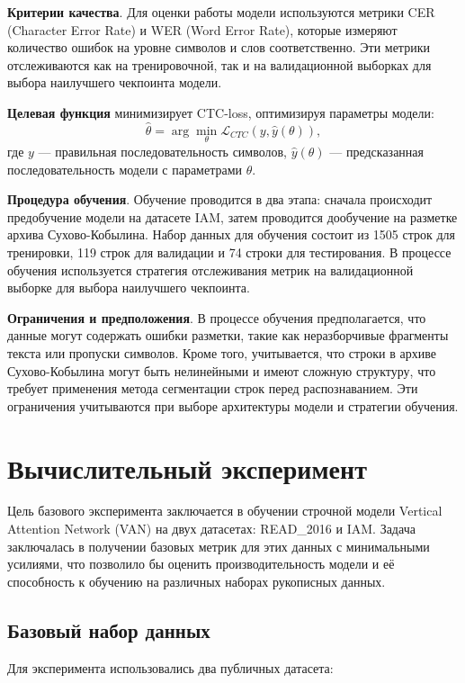 \documentclass{extarticle}
\begin{document}
\textbf{Критерии качества}. Для оценки работы модели используются метрики CER (Character Error Rate) и WER (Word Error Rate), которые измеряют количество ошибок на уровне символов и слов соответственно. Эти метрики отслеживаются как на тренировочной, так и на валидационной выборках для выбора наилучшего чекпоинта модели.

\textbf{Целевая функция} минимизирует CTC-loss, оптимизируя параметры модели:
\[
\hat{\theta} = \arg\min_\theta \mathcal{L}_{CTC}(y, \hat{y}(\theta)),
\]
где \(y\) — правильная последовательность символов, \(\hat{y}(\theta)\) — предсказанная последовательность модели с параметрами \(\theta\).

\textbf{Процедура обучения}. Обучение проводится в два этапа: сначала происходит предобучение модели на датасете IAM, затем проводится дообучение на разметке архива Сухово-Кобылина. Набор данных для обучения состоит из 1505 строк для тренировки, 119 строк для валидации и 74 строки для тестирования. В процессе обучения используется стратегия отслеживания метрик на валидационной выборке для выбора наилучшего чекпоинта.

\textbf{Ограничения и предположения}. В процессе обучения предполагается, что данные могут содержать ошибки разметки, такие как неразборчивые фрагменты текста или пропуски символов. Кроме того, учитывается, что строки в архиве Сухово-Кобылина могут быть нелинейными и имеют сложную структуру, что требует применения метода сегментации строк перед распознаванием. Эти ограничения учитываются при выборе архитектуры модели и стратегии обучения.



\section{Вычислительный эксперимент}

Цель базового эксперимента заключается в обучении строчной модели Vertical Attention Network (VAN) на двух датасетах: READ\_2016 и IAM. Задача заключалась в получении базовых метрик для этих данных с минимальными усилиями, что позволило бы оценить производительность модели и её способность к обучению на различных наборах рукописных данных.

\subsection{Базовый набор данных}

Для эксперимента использовались два публичных датасета:
\end{document}
